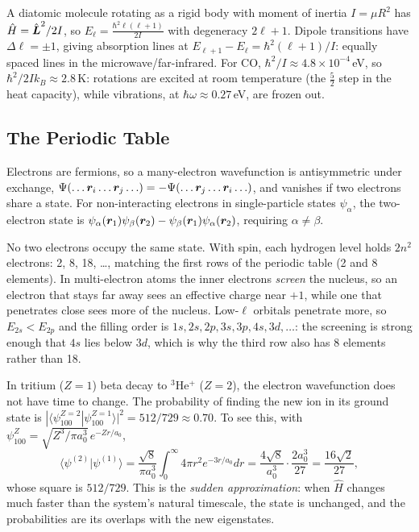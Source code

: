 \begin{example}
A diatomic molecule rotating as a rigid body with moment of inertia $I = \mu R^2$ has $\hat{H} = \hat{\vect{L}}^2/2I$, so $E_\ell = \frac{\hbar^2\ell(\ell+1)}{2I}$ with degeneracy $2\ell+1$. Dipole transitions have $\Delta\ell = \pm1$, giving absorption lines at $E_{\ell+1} - E_\ell = \hbar^2(\ell+1)/I$: equally spaced lines in the microwave/far-infrared. For CO, $\hbar^2/I\approx4.8\times10^{-4}$\,eV, so $\hbar^2/2Ik_B\approx2.8$\,K: rotations are excited at room temperature (the $\frac52$ step in the heat capacity), while vibrations, at $\hbar\omega\approx0.27$\,eV, are frozen out.
\end{example}

\subsection{The Periodic Table}

Electrons are fermions, so a many-electron wavefunction is antisymmetric under exchange, $\Psi(\ldots\bm{r}_i\ldots\bm{r}_j\ldots) = -\Psi(\ldots\bm{r}_j\ldots\bm{r}_i\ldots)$, and vanishes if two electrons share a state. For non-interacting electrons in single-particle states $\psi_\alpha$, the two-electron state is $\psi_\alpha(\bm{r}_1)\psi_\beta(\bm{r}_2) - \psi_\beta(\bm{r}_1)\psi_\alpha(\bm{r}_2)$, requiring $\alpha\neq\beta$.

\begin{fact}
No two electrons occupy the same state. With spin, each hydrogen level holds $2n^2$ electrons: 2, 8, 18, \ldots, matching the first rows of the periodic table (2 and 8 elements). In multi-electron atoms the inner electrons \emph{screen} the nucleus, so an electron that stays far away sees an effective charge near $+1$, while one that penetrates close sees more of the nucleus. Low-$\ell$ orbitals penetrate more, so $E_{2s}<E_{2p}$ and the filling order is $1s, 2s, 2p, 3s, 3p, 4s, 3d,\ldots$: the screening is strong enough that $4s$ lies below $3d$, which is why the third row also has 8 elements rather than 18.
\end{fact}

\begin{example}
In tritium ($Z = 1$) beta decay to $^3$He$^+$ ($Z = 2$), the electron wavefunction does not have time to change. The probability of finding the new ion in its ground state is $|\langle\psi_{100}^{Z=2}|\psi_{100}^{Z=1}\rangle|^2 = 512/729\approx0.70$. To see this, with $\psi_{100}^{Z} = \sqrt{Z^3/\pi a_0^3}\,e^{-Zr/a_0}$,
\[
    \langle\psi^{(2)}|\psi^{(1)}\rangle = \frac{\sqrt{8}}{\pi a_0^3}\int_0^\infty4\pi r^2e^{-3r/a_0}dr = \frac{4\sqrt8}{a_0^3}\cdot\frac{2a_0^3}{27} = \frac{16\sqrt2}{27},
\]
whose square is $512/729$. This is the \emph{sudden approximation}: when $\hat{H}$ changes much faster than the system's natural timescale, the state is unchanged, and the probabilities are its overlaps with the new eigenstates.
\end{example}


